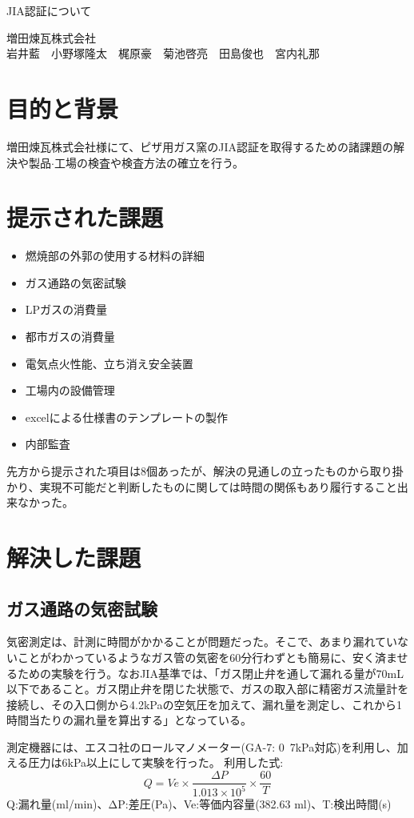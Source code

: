 \documentclass[upLaTeX,11pt]{ujarticle}
\begin{document}
\begin{center}
    {\LARGE JIA認証について}
\begin{flushright}
    増田煉瓦株式会社\\
    岩井藍　小野塚隆太　梶原豪　菊池啓亮　田島俊也　宮内礼那
\end{flushright}
\end{center}
\section{目的と背景}
増田煉瓦株式会社様にて、ピザ用ガス窯のJIA認証を取得するための諸課題の解決や製品$\cdot$工場の検査や検査方法の確立を行う。
\section{提示された課題}
\begin{itemize}
\item 燃焼部の外郭の使用する材料の詳細
\item ガス通路の気密試験
\item LPガスの消費量
\item 都市ガスの消費量
\item 電気点火性能、立ち消え安全装置
\item 工場内の設備管理
\item excelによる仕様書のテンプレートの製作
\item 内部監査
\end{itemize}
先方から提示された項目は8個あったが、解決の見通しの立ったものから取り掛かり、実現不可能だと判断したものに関しては時間の関係もあり履行すること出来なかった。
\section{解決した課題}
\subsection{ガス通路の気密試験}
気密測定は、計測に時間がかかることが問題だった。そこで、あまり漏れていないことがわかっているようなガス管の気密を60分行わずとも簡易に、安く済ませるための実験を行う。なおJIA基準では、「ガス閉止弁を通して漏れる量が70mL以下であること。ガス閉止弁を閉じた状態で、ガスの取入部に精密ガス流量計を接続し、その入口側から4.2kPaの空気圧を加えて、漏れ量を測定し、これから1時間当たりの漏れ量を算出する」となっている。

測定機器には、エスコ社のロールマノメーター(GA-7: 0~7kPa対応)を利用し、加える圧力は6kPa以上にして実験を行った。
利用した式:
\begin{equation*}
    Q=Ve\times\frac{\Delta P}{1.013\times10^5}\times\frac{60}{T}
\end{equation*}
Q:漏れ量(ml/min)、ΔP:差圧(Pa)、Ve:等価内容量(382.63 ml)、T:検出時間(s)
\end{document}
